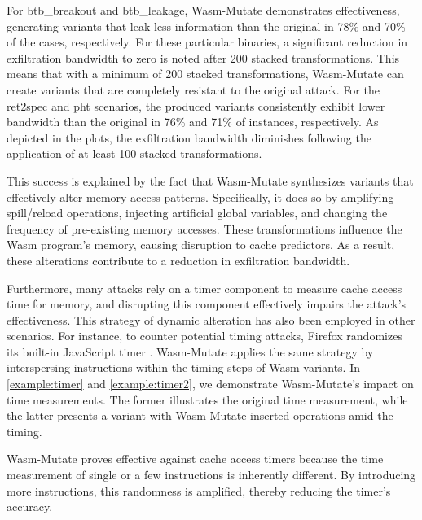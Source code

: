 \documentclass[sigplan,screen]{acmart}
\newcommand{\tool}{{\sc Wasm-Mutate}\xspace}
\newcommand{\wasm}{Wasm\xspace}
\begin{document}
For btb\_breakout and btb\_leakage, \tool demonstrates effectiveness, generating variants that leak less information than the original in 78\% and 70\% of the cases, respectively.
For these particular binaries, a significant reduction in exfiltration bandwidth to zero is noted after 200 stacked transformations.
This means that with a minimum of 200 stacked transformations, \tool can create variants that are completely resistant to the original attack.
For the ret2spec and pht scenarios, the produced variants consistently exhibit lower bandwidth than the original in 76\% and 71\% of instances, respectively.
As depicted in the plots, the exfiltration bandwidth diminishes following the application of at least  100 stacked transformations.

This success is explained by the fact that \tool synthesizes variants that effectively alter memory access patterns. 
Specifically, it does so by amplifying spill/reload operations, injecting artificial global variables, and changing the frequency of pre-existing memory accesses. 
These transformations influence the \wasm program's memory, causing disruption to cache predictors. 
As a result, these alterations contribute to a reduction in exfiltration bandwidth.

Furthermore, many attacks rely on a timer component to measure cache access time for memory, and disrupting this component  effectively impairs the attack's effectiveness. 
This strategy of dynamic alteration has also been  employed in other scenarios. 
For instance, to counter potential timing attacks, Firefox randomizes its built-in JavaScript timer \cite{10.1007/978-3-319-70972-7_13}. \tool applies the same strategy by interspersing instructions within the timing steps of \wasm variants. 
In \autoref{example:timer} and \autoref{example:timer2}, we demonstrate \tool's impact on time measurements. 
The former illustrates the original time measurement, while the latter presents a variant with \tool-inserted operations amid the timing.



\tool proves effective against cache access timers because the time measurement of single or a few instructions is inherently different. 
By introducing more instructions, this randomness is amplified, thereby reducing the timer's accuracy.
\end{document}
